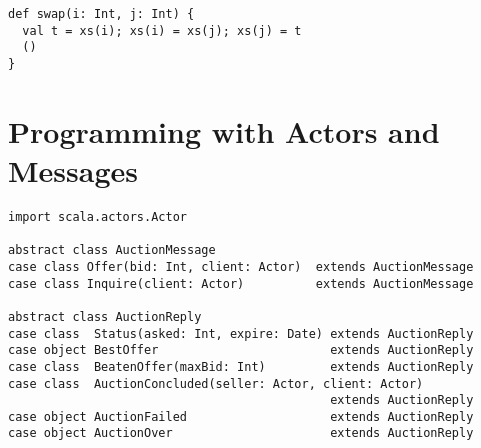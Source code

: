 
\begin{lstlisting}
def swap(i: Int, j: Int) {
  val t = xs(i); xs(i) = xs(j); xs(j) = t
  ()
}
\end{lstlisting}


\chapter{Programming with Actors and Messages}
\label{chap:example-auction}
\begin{lstlisting}[style=floating,label=fig:simple-auction-msgs,caption=Message
    Classes for an Auction Service]
import scala.actors.Actor

abstract class AuctionMessage
case class Offer(bid: Int, client: Actor)  extends AuctionMessage
case class Inquire(client: Actor)          extends AuctionMessage

abstract class AuctionReply
case class  Status(asked: Int, expire: Date) extends AuctionReply
case object BestOffer                        extends AuctionReply
case class  BeatenOffer(maxBid: Int)         extends AuctionReply
case class  AuctionConcluded(seller: Actor, client: Actor) 
                                             extends AuctionReply
case object AuctionFailed                    extends AuctionReply
case object AuctionOver                      extends AuctionReply
\end{lstlisting}

